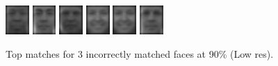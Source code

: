 \begin{figure}[hbt]
  \includegraphics[width=0.08\textwidth]{../results/L_rez/incorrect90/3/5.jpg}
  \includegraphics[width=0.08\textwidth]{../results/L_rez/incorrect90/3/6.jpg}
  \includegraphics[width=0.08\textwidth]{../results/L_rez/incorrect90/3/7.jpg}
  \includegraphics[width=0.08\textwidth]{../results/L_rez/incorrect90/3/8.jpg}
  \includegraphics[width=0.08\textwidth]{../results/L_rez/incorrect90/3/8.jpg}
  \includegraphics[width=0.08\textwidth]{../results/L_rez/incorrect90/3/10.jpg}
  \caption{Top matches for 3 incorrectly matched faces at 90\% (Low res).}
  \label{fig:incorrect90_l}
\end{figure}

~\vfill

\clearpage

~\vfill

